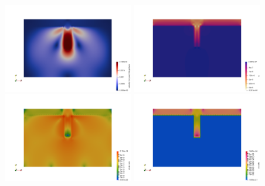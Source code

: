 \begin{center}
\includegraphics[width=5.7cm]{python_codes/fieldstone_87/results/experiment_03/vel.png}
\includegraphics[width=5.7cm]{python_codes/fieldstone_87/results/experiment_03/p.png}\\
\includegraphics[width=5.7cm]{python_codes/fieldstone_87/results/experiment_03/sr.png}
\includegraphics[width=5.7cm]{python_codes/fieldstone_87/results/experiment_03/eta.png}\\
\end{center}

